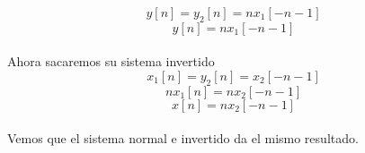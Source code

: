 \documentclass[10pt,a4paper]{report}
\begin{document}
\begin{equation}
y\left [ n \right ]=y_{2}\left [ n \right ]=nx_{1}\left [ -n-1 \right ]
\end{equation}
\begin{equation}
y\left [ n \right ]=nx_{1}\left [ -n-1 \right ]
\end{equation}\\

Ahora sacaremos su sistema invertido\\
\begin{equation}
x_{1}\left [ n \right ]=y_{2}\left [ n \right ]=x_{2}\left [ -n-1 \right ]
\end{equation}
\begin{equation}
nx_{1}\left [ n \right ]=nx_{2}\left [ -n-1 \right ]
\end{equation}
\begin{equation}
x\left [ n \right ]=nx_{2}\left [ -n-1 \right ]
\end{equation}\\

Vemos que el sistema normal e invertido da el mismo resultado.
\end{document}
